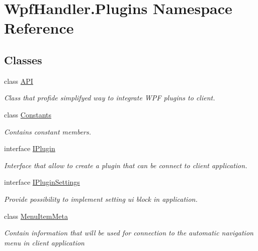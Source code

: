 \hypertarget{namespace_wpf_handler_1_1_plugins}{}\section{Wpf\+Handler.\+Plugins Namespace Reference}
\label{namespace_wpf_handler_1_1_plugins}
\subsection*{Classes}
\begin{DoxyCompactItemize}
\item 
class \mbox{\hyperlink{class_wpf_handler_1_1_plugins_1_1_a_p_i}{A\+PI}}
\begin{DoxyCompactList}\small\item\em Class that profide simplifyed way to integrate W\+PF plugins to client. \end{DoxyCompactList}\item 
class \mbox{\hyperlink{class_wpf_handler_1_1_plugins_1_1_constants}{Constants}}
\begin{DoxyCompactList}\small\item\em Contains constant members. \end{DoxyCompactList}\item 
interface \mbox{\hyperlink{interface_wpf_handler_1_1_plugins_1_1_i_plugin}{I\+Plugin}}
\begin{DoxyCompactList}\small\item\em Interface that allow to create a plugin that can be connect to client application. \end{DoxyCompactList}\item 
interface \mbox{\hyperlink{interface_wpf_handler_1_1_plugins_1_1_i_plugin_settings}{I\+Plugin\+Settings}}
\begin{DoxyCompactList}\small\item\em Provide possibility to implement setting ui block in application. \end{DoxyCompactList}\item 
class \mbox{\hyperlink{class_wpf_handler_1_1_plugins_1_1_menu_item_meta}{Menu\+Item\+Meta}}
\begin{DoxyCompactList}\small\item\em Contain information that will be used for connection to the automatic navigation menu in client application \end{DoxyCompactList}\end{DoxyCompactItemize}
